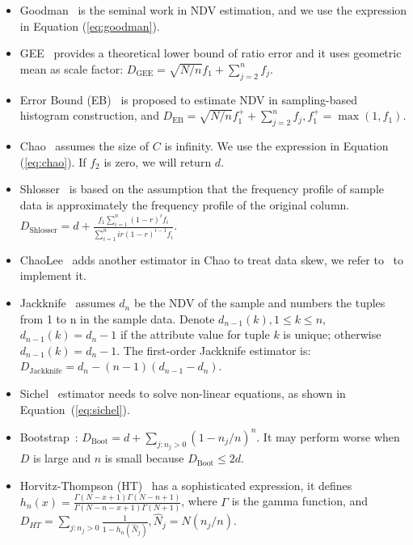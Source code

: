 \begin{itemize}[leftmargin=10pt]
\item Goodman~\cite{goodman1949estimation} is the seminal work in NDV estimation, and we use the expression in Equation (\ref{eq:goodman}). 
\item GEE~\cite{gee_charikar2000towards} provides a theoretical lower bound of ratio error and it uses geometric mean as scale factor: $D_{\mathrm{GEE}}=\sqrt{N/n}f_1+\sum_{j=2}^nf_j$.
\item Error Bound (EB)~\cite{error_bound} is proposed to estimate NDV in sampling-based histogram construction, and $D_{\mathrm{EB}}=\sqrt{N/n}f_1^++\sum_{j=2}^nf_j,f_1^+=\max(1,f_1)$.
\item Chao~\cite{chao1984nonparametric,chao_in_db_ozsoyoglu1991estimating} assumes the size of $C$ is infinity. We use the expression in Equation (\ref{eq:chao}). If $f_2$ is zero, we will return $d$.
\item Shlosser~\cite{shlosser1981estimation} is based on the assumption that the frequency profile of sample data is approximately the frequency profile of the original column. ${D}_{\text{Shlosser}} = d + \frac{f_1 \sum_{i=1}^n (1 - r)^i f_i}{\sum_{i=1}^n ir(1 - r)^{i-1} f_i}$.
\item ChaoLee~\cite{chaolee} adds another estimator in Chao to treat data skew, we refer to~\cite{ndvlib} to implement it.
\item Jackknife~\cite{burnham1978estimation,burnham1979robust} assumes $d_n$ be the NDV of the sample and numbers the tuples from 1 to n in the sample data. Denote $d_{n-1}(k),1\leq k \leq n$, $d_{n-1}(k)=d_n-1$ if the attribute value for tuple $k$ is unique; otherwise $d_{n-1}(k)=d_n-1$. The first-order Jackknife estimator is: $D_{\mathrm{Jackknife}}=d_n-(n-1)(d_{n-1}-d_n)$.
\item Sichel~\cite{sichel1986parameter,sichel1986word,sichel1992anatomy} estimator needs to solve non-linear equations, as shown in Equation~(\ref{eq:sichel}).
\item Bootstrap~\cite{bootstrap_smith1984nonparametric}: $D_{\mathrm{Boot}}=d+\sum_{j:n_j>0}(1-n_j/n)^n$. It may perform worse when $D$ is large and $n$ is small because $D_{\mathrm{Boot}}\leq 2d$.
\item Horvitz-Thompson (HT)~\cite{horvitz_sarndal1992model} has a sophisticated expression, it defines $h_n(x)=\frac{\Gamma(N-x+1)\Gamma(N-n+1)}{\Gamma(N-n-x+1)\Gamma(N+1)}$, where $\Gamma$ is the gamma function, and $D_{HT}=\sum_{j:n_j>0}\frac{1}{1-h_n(\hat{N}_j)},\hat{N}_j=N(n_j/n)$. 

\end{itemize}
